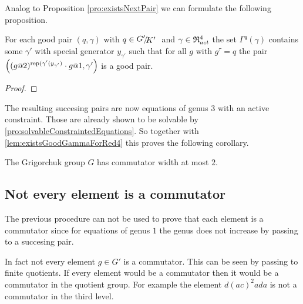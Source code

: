 \documentclass[a4paper,11pt]{amsart}
\begin{document}
Analog to Proposition \ref{pro:existsNextPair} we can formulate the following proposition.
\begin{pro}\label{pro:existsNextPair}
 For each good pair $(q,\gamma)$ with $q\in\RNK{G'}{K'}$ and $\gamma\in\mathfrak{R}^4_{act}$ the set $\Gamma^q(\gamma)$ 
 contains some $\gamma'$ with special generator $y_{\gamma'}$ such that for all $g$ with $g^\tau=q$ the
 pair $\left((g\at{2})^{\textup{rep}(\gamma'(y_{\gamma'})}\cdot g\at{1},\gamma'\right)$ is a good pair.
\end{pro}
\begin{proof}
\end{proof}
The resulting succesing pairs are now equations of genus $3$ with an active constraint. Those are already shown to be solvable 
by \ref{pro:solvableConstraintedEquations}. So together with \ref{lem:existsGoodGammaForRed4} this proves the following corollary.
\begin{cor}
 The Grigorchuk group $G$ has commutator width at most $2$.
\end{cor}
% 
% 
\subsection{Not every element is a commutator}
The previous procedure can not be used to prove that each element is a commutator since for equations of genus $1$ the 
genus does not increase by passing to a succesing pair. 

In fact not every element $g\in G'$ is a commutator. This can be seen by passing to finite quotients. If every element would be a commutator then
it would be a commutator in the quotient group. 
For example the element $d(ac)^2ada$ is not a commutator in the third level.
\end{document}
